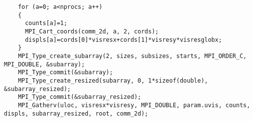 \begin{frame}[fragile]
  \begin{lstlisting}
    for (a=0; a<nprocs; a++)
    {
      counts[a]=1;
      MPI_Cart_coords(comm_2d, a, 2, cords);
      displs[a]=cords[0]*visresx+cords[1]*visresy*visresglobx;
    }
    MPI_Type_create_subarray(2, sizes, subsizes, starts, MPI_ORDER_C, MPI_DOUBLE, &subarray);
    MPI_Type_commit(&subarray);
    MPI_Type_create_resized(subarray, 0, 1*sizeof(double), &subarray_resized);
    MPI_Type_commit(&subarray_resized);
    MPI_Gatherv(uloc, visresx*visresy, MPI_DOUBLE, param.uvis, counts, displs, subarray_resized, root, comm_2d);
  \end{lstlisting}
\end{frame}
